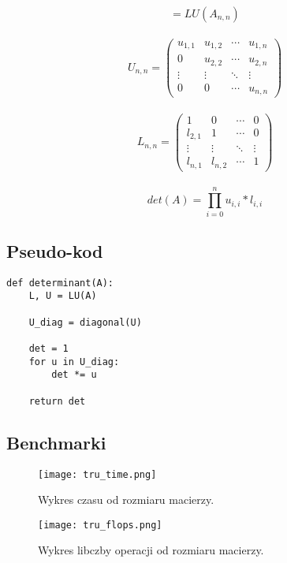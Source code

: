 \documentclass{article}
\begin{document}
\begin{equation}
[ L_{n,n}, U_{n,n} ] = LU(A_{n,n})
\end{equation}\\
\begin{equation}
U_{n,n} = 
 \begin{pmatrix}
  u_{1,1} & u_{1,2} & \cdots & u_{1,n} \\
  0 & u_{2,2} & \cdots & u_{2,n} \\
  \vdots  & \vdots  & \ddots & \vdots  \\
  0 & 0 & \cdots & u_{n,n} 
 \end{pmatrix}
\end{equation}\\
\begin{equation}
L_{n,n} = 
 \begin{pmatrix}
  1 & 0 & \cdots & 0 \\
  l_{2,1} & 1 & \cdots & 0 \\
  \vdots  & \vdots  & \ddots & \vdots  \\
  l_{n,1}  & l_{n,2}  & \cdots & 1 
 \end{pmatrix}
\end{equation}\\
\begin{equation}
det(A) = \prod_{i = 0}^{n} u_{i, i} * l_{i, i}
\end{equation}

\subsection{Pseudo-kod}
\begin{lstlisting}
def determinant(A):
    L, U = LU(A)

    U_diag = diagonal(U)

    det = 1
    for u in U_diag:
        det *= u
        
    return det
\end{lstlisting}

\subsection{Benchmarki}
\begin{center}
\begin{figure}[H]
  \texttt{[image: tru\_time.png]}
  \caption{Wykres czasu od rozmiaru macierzy.}
\end{figure}

\begin{figure}[H]
  \texttt{[image: tru\_flops.png]}
  \caption{Wykres libczby operacji od rozmiaru macierzy.}
\end{figure}
\end{center}
\end{document}
